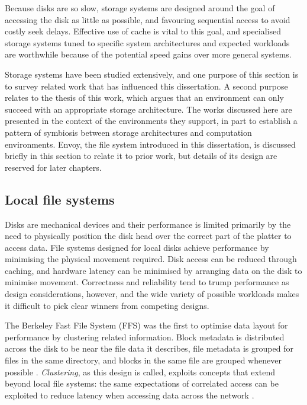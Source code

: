 Because disks are so slow, storage systems are designed around the goal of accessing the disk as little as possible, and favouring sequential access to avoid costly seek delays. Effective use of cache is vital to this goal, and specialised storage systems tuned to specific system architectures and expected workloads are worthwhile because of the potential speed gains over more general systems.

Storage systems have been studied extensively, and one purpose of this section is to survey related work that has influenced this dissertation. A second purpose relates to the thesis of this work, which argues that an environment can only succeed with an appropriate storage architecture. The works discussed here are presented in the context of the environments they support, in part to establish a pattern of symbiosis between storage architectures and computation environments. Envoy, the file system introduced in this dissertation, is discussed briefly in this section to relate it to prior work, but details of its design are reserved for later chapters.

\subsection{Local file systems}

Disks are mechanical devices and their performance is limited primarily by the need to physically position the disk head over the correct part of the platter to access data. File systems designed for local disks achieve performance by minimising the physical movement required. Disk access can be reduced through caching, and hardware latency can be minimised by arranging data on the disk to minimise movement. Correctness and reliability tend to trump performance as design considerations, however, and the wide variety of possible workloads makes it difficult to pick clear winners from competing designs.

The Berkeley Fast File System (FFS) was the first to optimise data layout for performance by clustering related information. Block metadata is distributed across the disk to be near the file data it describes, file metadata is grouped for files in the same directory, and blocks in the same file are grouped whenever possible \cite{mckusick}. \emph{Clustering}, as this design is called, exploits concepts that extend beyond local file systems: the same expectations of correlated access can be exploited to reduce latency when accessing data across the network \cite{amer}.

